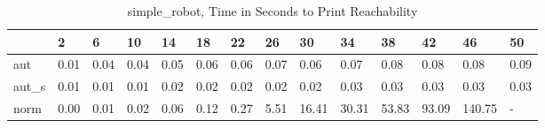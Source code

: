 \begin{table}
\caption{simple_robot, Time in Seconds to Print Reachability}
\label{simple_robot_states_time}
\begin{tabular}{llllllllllllll}
\toprule
 & 2 & 6 & 10 & 14 & 18 & 22 & 26 & 30 & 34 & 38 & 42 & 46 & 50 \\
\midrule
aut & 0.01 & 0.04 & 0.04 & 0.05 & 0.06 & 0.06 & 0.07 & 0.06 & 0.07 & 0.08 & 0.08 & 0.08 & 0.09 \\
aut_s & 0.01 & 0.01 & 0.01 & 0.02 & 0.02 & 0.02 & 0.02 & 0.02 & 0.03 & 0.03 & 0.03 & 0.03 & 0.03 \\
norm & 0.00 & 0.01 & 0.02 & 0.06 & 0.12 & 0.27 & 5.51 & 16.41 & 30.31 & 53.83 & 93.09 & 140.75 & - \\
\bottomrule
\end{tabular}
\end{table}
